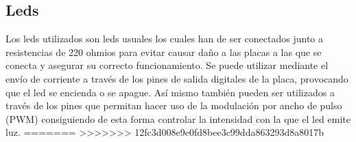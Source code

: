 \subsection{Leds}\label{subsec:leds}

Los leds utilizados son leds usuales los cuales han de ser conectados
junto a resistencias de 220 ohmios para evitar causar daño a las placas a las que
se conecta y asegurar su correcto funcionamiento. Se puede utilizar mediante el env\'io de corriente a
trav\'es de los pines de salida digitales de la placa, provocando que
el led se encienda o se apague. As\'i mismo tambi\'en pueden ser
utilizados a trav\'es de los pines que permitan hacer uso de la
modulaci\'on por ancho de pulso (PWM) consiguiendo de esta forma
controlar la intensidad con la que el led emite luz. 
=======
>>>>>>> 12fc3d008e9e0fd8bee3c99dda863293d8a8017b
